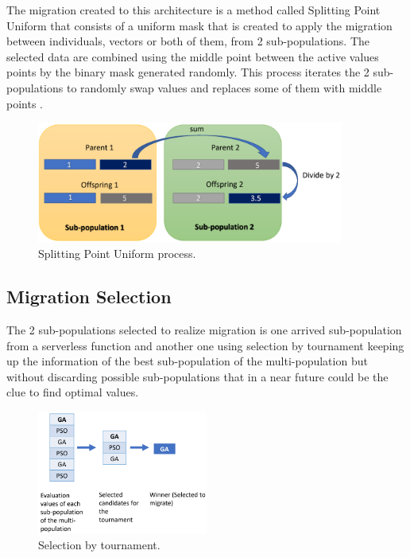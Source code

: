 \documentclass[runningheads]{llncs}
\begin{document}
The migration created to this architecture is a method called Splitting Point
Uniform that consists of a uniform mask that is created to apply the migration
between individuals, vectors or both of them, from 2 sub-populations. The
selected data are combined using the middle point between the active values
points by the binary mask generated randomly. This process iterates the 2
sub-populations to randomly swap values and replaces some of them with middle
points \cite{Kramer2017,Kaya2011}.


\begin{figure}[htp]
  \centering
  \includegraphics[width=0.9\textwidth]{img/splittinPointUniform.png}
  \caption{Splitting Point Uniform process.} \label{fig4}
  \end{figure}

  \subsection{Migration Selection} The 2 sub-populations selected to realize
  migration is one arrived sub-population from a serverless function and another
  one using selection by tournament keeping up the information of the best
  sub-population of the multi-population but without discarding possible
  sub-populations that in a near future could be the clue to find optimal
  values.

\begin{figure}[htp]
  \centering
  \includegraphics[width=0.5\textwidth]{img/selection.png}
  \caption{Selection by tournament.} \label{fig5}
  \end{figure}
\end{document}
